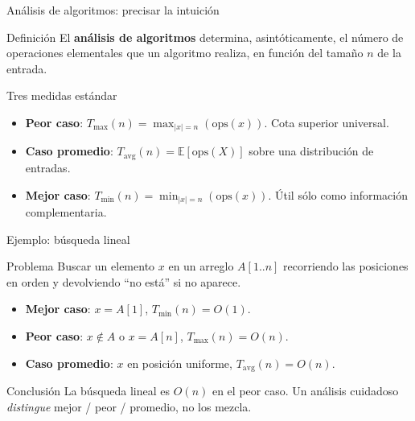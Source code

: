 \documentclass[10pt,xcolor=dvipsnames]{beamer}
\begin{document}
\begin{frame}{Análisis de algoritmos: precisar la intuición}
  \begin{block}{Definición}
    El \textbf{análisis de algoritmos} determina, asintóticamente, el número
    de operaciones elementales que un algoritmo realiza, en función del
    tamaño $n$ de la entrada.
  \end{block}

  \begin{block}{Tres medidas estándar}
    \begin{itemize}
      \item \textbf{Peor caso}: $T_{\max}(n) = \max_{|x|=n} (\text{ops}(x))$.
            Cota superior universal.
      \item \textbf{Caso promedio}: $T_{\text{avg}}(n) =
            \mathbb{E}[\text{ops}(X)]$ sobre una distribución de entradas.
      \item \textbf{Mejor caso}: $T_{\min}(n) = \min_{|x|=n} (\text{ops}(x))$.
            Útil sólo como información complementaria.
    \end{itemize}
  \end{block}
\end{frame}

\begin{frame}{Ejemplo: búsqueda lineal}
  \begin{exampleblock}{Problema}
    Buscar un elemento $x$ en un arreglo $A[1..n]$ recorriendo las
    posiciones en orden y devolviendo ``no está'' si no aparece.
  \end{exampleblock}

  \begin{itemize}
    \item \textbf{Mejor caso}: $x = A[1]$, $T_{\min}(n) = O(1)$.
    \item \textbf{Peor caso}: $x \notin A$ o $x = A[n]$,
          $T_{\max}(n) = O(n)$.
    \item \textbf{Caso promedio}: $x$ en posición uniforme,
          $T_{\text{avg}}(n) = O(n)$.
  \end{itemize}

  \begin{alertblock}{Conclusión}
    La búsqueda lineal es $O(n)$ en el peor caso.
    Un análisis cuidadoso \emph{distingue} mejor / peor / promedio, no los
    mezcla.
  \end{alertblock}
\end{frame}
\end{document}
